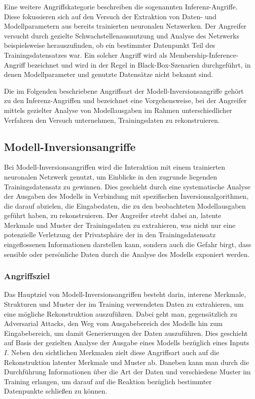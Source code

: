 Eine weitere Angriffskategorie beschreiben die sogenannten Inferenz-Angriffe. Diese fokussieren sich auf den Versuch der Extraktion von Daten- und Modellparametern aus bereits trainierten neuronalen Netzwerken. Der Angreifer versucht durch gezielte Schwachstellenausnutzung und Analyse des Netzwerks beispielsweise herauszufinden, ob ein bestimmter Datenpunkt Teil des Trainingsdatensatzes war. Ein solcher Angriff wird als \glqq Membership-Inference-Angriff\grqq{} bezeichnet und wird in der Regel in Black-Box-Szenarien durchgeführt, in denen Modellparameter und genutzte Datensätze nicht bekannt sind. 

Die im Folgenden beschriebene Angriffsart der \glqq Modell-Inversionsangriffe\grqq{} gehört zu den Inferenz-Angriffen und bezeichnet eine Vorgehensweise, bei der Angreifer mittels gezielter Analyse von Modellausgaben im Rahmen unterschiedlicher Verfahren den Versuch unternehmen, Trainingsdaten zu rekonstruieren.

\subsection{Modell-Inversionsangriffe} \label{subsec: MIAttack}
Bei Modell-Inversionsangriffen wird die Interaktion mit einem trainierten neuronalen Netzwerk genutzt, um Einblicke in den zugrunde liegenden Trainingsdatensatz zu gewinnen. Dies geschieht durch eine systematische Analyse der Ausgaben des Modells in Verbindung mit spezifischen Inversionsalgorithmen, die darauf abzielen, die Eingabedaten, die zu den beobachteten Modellausgaben geführt haben, zu rekonstruieren. Der Angreifer strebt dabei an, latente Merkmale und Muster der Trainingsdaten zu extrahieren, was nicht nur eine potenzielle Verletzung der Privatsphäre der in den Trainingsdatensatz eingeflossenen Informationen darstellen kann, sondern auch die Gefahr birgt, dass sensible oder persönliche Daten durch die Analyse des Modells exponiert werden.
\subsubsection{Angriffsziel}
Das Hauptziel von Modell-Inversionsangriffen besteht darin, interene Merkmale, Strukturen und Muster der im Training verwendeten Daten zu extrahieren, um eine mögliche Rekonstruktion auszuführen. Dabei geht man, gegensätzlich zu \glqq Adversarial Attacks\grqq{}, den Weg vom Ausgabebereich des Modells hin zum Eingabebereich, um damit Generierungen der Daten auszuführen. Dies geschieht auf Basis der gezielten Analyse der Ausgabe eines Modells bezüglich eines Inputs $I$. Neben den sichtlichen Merkmalen zielt diese Angriffsart auch auf die Rekonstruktion latenter Merkmale und Muster ab. Daneben kann man durch die Durchführung Informationen über die Art der Daten und verschiedene Muster im Training erlangen, um darauf auf die Reaktion bezüglich bestimmter Datenpunkte schließen zu können.

